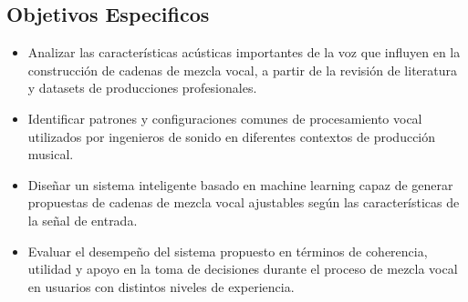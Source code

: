 \subsection{Objetivos Especificos}

\begin{itemize}
    \item Analizar las características acústicas importantes de la voz que influyen en la construcción de cadenas de mezcla vocal, a partir de la revisión de literatura y datasets de producciones profesionales.
    \item Identificar patrones y configuraciones comunes de procesamiento vocal utilizados por ingenieros de sonido en diferentes contextos de producción musical.
    \item Diseñar un sistema inteligente basado en machine learning capaz de generar propuestas de cadenas de mezcla vocal ajustables según las características de la señal de entrada.
    \item Evaluar el desempeño del sistema propuesto en términos de coherencia, utilidad y apoyo en la toma de decisiones durante el proceso de mezcla vocal en usuarios con distintos niveles de experiencia.
\end{itemize}


